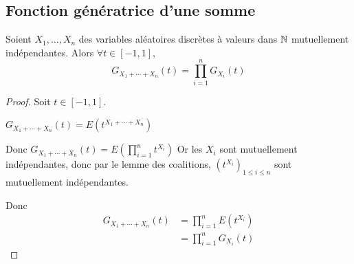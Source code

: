 \subsection{Fonction génératrice d'une somme }

\begin{theoreme}{}{}
    Soient $X_1, \dots, X_n$ des variables aléatoires discrètes à valeurs dans $\mathbb{N}$ mutuellement 
    indépendantes. Alors $\forall t \in [-1, 1]$,
    $$ G_{X_1 + \cdots + X_n}(t) = \prod_{i = 1}^n G_{X_i}(t) $$
\end{theoreme}

\begin{proof}
    Soit $t \in [-1, 1]$.

    $G_{X_1 + \cdots + X_n}(t) = E\left( t^{X_1 + \cdots + X_n} \right)$

    Donc $G_{X_1 + \cdots + X_n}(t) = E\left( \prod_{i = 1 }^{n } t^{X_i} \right)$
    Or les $X_i$ sont mutuellement indépendantes, donc par le lemme des coalitions, 
    $(t^{X_i})_{1 \leqslant i \leqslant n}$ sont mutuellement indépendantes.

    Donc 
    \begin{align}
        G_{X_1 + \cdots + X_n}(t) & = \prod_{i = 1 }^{ n } E\left( t^{X_i} \right) \\
        & = \prod_{i = 1 }^{ n } G_{X_i}(t)
    \end{align}
\end{proof}